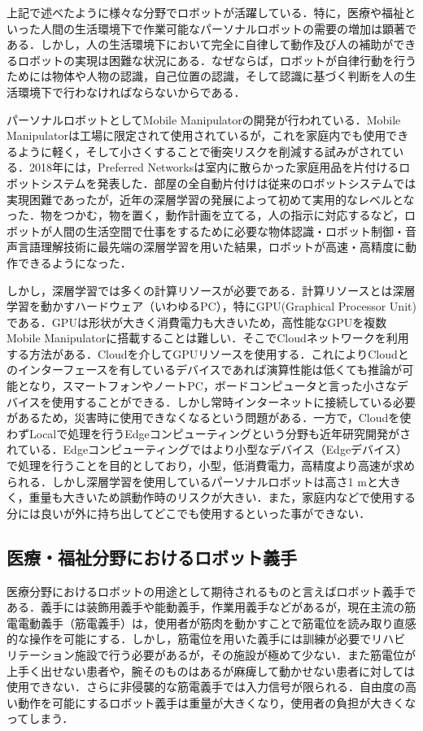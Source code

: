 
上記で述べたように様々な分野でロボットが活躍している．特に，医療や福祉といった人間の生活環境下で作業可能なパーソナルロボットの需要の増加は顕著である．しかし，人の生活環境下において完全に自律して動作及び人の補助ができるロボットの実現は困難な状況にある．なぜならば，ロボットが自律行動を行うためには物体や人物の認識，自己位置の認識，そして認識に基づく判断を人の生活環境下で行わなければならないからである．

パーソナルロボットとしてMobile Manipulatorの開発が行われている．Mobile Manipulatorは工場に限定されて使用されているが，これを家庭内でも使用できるように軽く，そして小さくすることで衝突リスクを削減する試みがされている．2018年には，Preferred Networksは室内に散らかった家庭用品を片付けるロボットシステムを発表した\cite{お片づけロボット}．部屋の全自動片付けは従来のロボットシステムでは実現困難であったが，近年の深層学習の発展によって初めて実用的なレベルとなった．物をつかむ，物を置く，動作計画を立てる，人の指示に対応するなど，ロボットが人間の生活空間で仕事をするために必要な物体認識・ロボット制御・音声言語理解技術に最先端の深層学習を用いた結果，ロボットが高速・高精度に動作できるようになった．

しかし，深層学習では多くの計算リソースが必要である．計算リソースとは深層学習を動かすハードウェア（いわゆるPC），特にGPU(Graphical Processor Unit)である．GPUは形状が大きく消費電力も大きいため，高性能なGPUを複数Mobile Manipulatorに搭載することは難しい．そこでCloudネットワークを利用する方法がある．Cloudを介してGPUリソースを使用する．これによりCloudとのインターフェースを有しているデバイスであれば演算性能は低くても推論が可能となり，スマートフォンやノートPC，ボードコンピュータと言った小さなデバイスを使用することができる．しかし常時インターネットに接続している必要があるため，災害時に使用できなくなるという問題がある．一方で，Cloudを使わずLocalで処理を行うEdgeコンピューティングという分野も近年研究開発がされている．Edgeコンピューティングではより小型なデバイス（Edgeデバイス）で処理を行うことを目的としており，小型，低消費電力，高精度より高速が求められる．しかし深層学習を使用しているパーソナルロボットは高さ1 mと大きく，重量も大きいため誤動作時のリスクが大きい．また，家庭内などで使用する分には良いが外に持ち出してどこでも使用するといった事ができない．


\subsection{医療・福祉分野におけるロボット義手}
医療分野におけるロボットの用途として期待されるものと言えばロボット義手である．義手には装飾用義手や能動義手，作業用義手などがあるが，現在主流の筋電電動義手（筋電義手）は，使用者が筋肉を動かすことで筋電位を読み取り直感的な操作を可能にする．しかし，筋電位を用いた義手には訓練が必要でリハビリテーション施設で行う必要があるが，その施設が極めて少ない\cite{リハビリテーション}．また筋電位が上手く出せない患者や，腕そのものはあるが麻痺して動かせない患者に対しては使用できない．さらに非侵襲的な筋電義手では入力信号が限られる．自由度の高い動作を可能にするロボット義手は重量が大きくなり，使用者の負担が大きくなってしまう．

